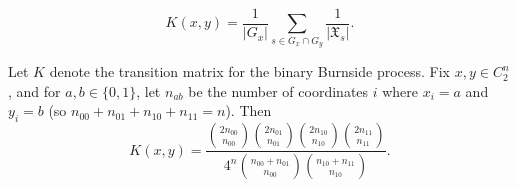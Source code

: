 \documentclass[10pt,a4paper]{amsart}
\newcommand{\mf}{\mathfrak}
\begin{document}
\begin{equation}\label{burnsidegenerictransition}
    K(x, y) = \frac{1}{|G_x|} \sum_{s \in G_x \cap G_y} \frac{1}{|\mf{X}_s|}.
\end{equation}

\begin{proposition}\label{closedformk}
Let $K$ denote the transition matrix for the binary Burnside process. Fix $x, y \in C_2^n$, and for $a, b \in \{0, 1\}$, let $n_{ab}$ be the number of coordinates $i$ where $x_i = a$ and $y_i = b$ (so $n_{00} + n_{01} + n_{10} + n_{11} = n$). Then 
\[
    K(x, y) = \frac{\binom{2n_{00}}{n_{00}} \binom{2n_{01}}{n_{01}} \binom{2n_{10}}{n_{10}} \binom{2n_{11}}{n_{11}}}{4^n\binom{n_{00} + n_{01}}{n_{00}}\binom{n_{10} + n_{11}}{n_{10}}}.
\]
\end{proposition}
\end{document}
